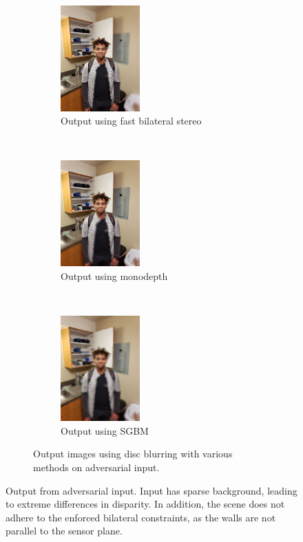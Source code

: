 \documentclass[10pt,twocolumn,letterpaper]{article}
\begin{document}
\begin{figure}[!t]
    \begin{subfigure}[t!]{\textwidth}
        \centering
        \begin{subfigure}[t]{0.33\textwidth}
            \centering
            \includegraphics[width=1.2in]{bin/output2_FBIL.jpg}
            \caption{Output using fast bilateral stereo}
        \end{subfigure}%
        ~
        \begin{subfigure}[t]{0.33\textwidth}
            \centering
            \includegraphics[width=1.2in]{bin/output2_monodepth.jpg}
            \caption{Output using monodepth}
        \end{subfigure}%
        ~
        \begin{subfigure}[t]{0.33\textwidth}
            \centering
            \includegraphics[width=1.2in]{bin/output2_SGBM.jpg}
            \caption{Output using SGBM}
        \end{subfigure}
        \caption*{Output images using disc blurring with various methods on adversarial input.}
    \end{subfigure}
    \caption{\small Output from adversarial input. Input has sparse background, leading to extreme differences in disparity. In addition, the scene does not adhere to the enforced bilateral constraints, as the walls are not parallel to the sensor plane.}
    \label{fig:output2}
\end{figure}
\end{document}
